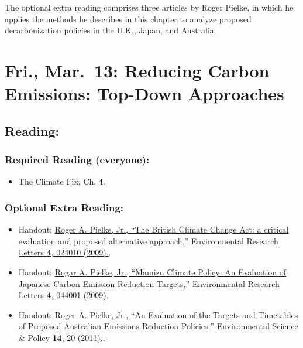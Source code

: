 \documentclass[
]{article}
\providecommand{\tightlist}{%
  \setlength{\itemsep}{0pt}\setlength{\parskip}{0pt}}
\begin{document}
The optional extra reading comprises three articles by Roger Pielke, in
which he applies the methods he describes in this chapter to analyze
proposed decarbonization policies in the U.K., Japan, and Australia.

\hypertarget{fri.-mar.-13-reducing-carbon-emissions-top-down-approaches}{%
\section{Fri., Mar.~13: Reducing Carbon Emissions: Top-Down
Approaches}\label{fri.-mar.-13-reducing-carbon-emissions-top-down-approaches}}

\hypertarget{reading-25}{%
\subsection{Reading:}\label{reading-25}}

\hypertarget{required-reading-everyone-20}{%
\subsubsection{Required Reading
(everyone):}\label{required-reading-everyone-20}}

\begin{itemize}
\tightlist
\item
  The Climate Fix, Ch. 4.
\end{itemize}

\hypertarget{optional-extra-reading-1}{%
\subsubsection{Optional Extra Reading:}\label{optional-extra-reading-1}}

\begin{itemize}
\tightlist
\item
  Handout:
  \href{http://iopscience.iop.org/article/10.1088/1748-9326/4/2/024010/meta}{Roger
  A. Pielke, Jr., ``The British Climate Change Act: a critical
  evaluation and proposed alternative approach,'' Environmental Research
  Letters \textbf{4}, 024010 (2009).}.
\item
  Handout:
  \href{http://iopscience.iop.org/article/10.1088/1748-9326/4/4/044001/meta}{Rogar
  A. Pielke, Jr., ``Mamizu Climate Policy: An Evaluation of Japanese
  Carbon Emission Reduction Targets,'' Environmental Research Letters
  \textbf{4}, 044001 (2009)}.
\item
  Handout:
  \href{https://www-sciencedirect-com.proxy.library.vanderbilt.edu/science/article/pii/S1462901110001383}{Roger
  A. Pielke, Jr., ``An Evaluation of the Targets and Timetables of
  Proposed Australian Emissions Reduction Policies,'' Environmental
  Science \& Policy \textbf{14}, 20 (2011).}.
\end{itemize}
\end{document}
